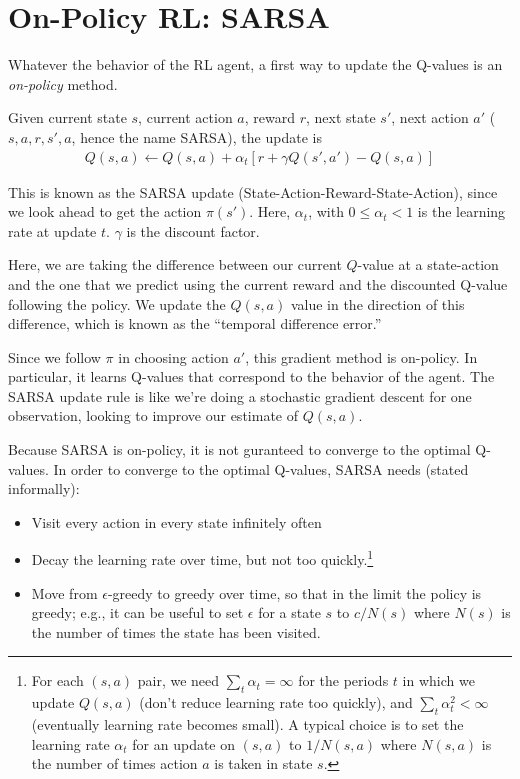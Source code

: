 \documentclass[12pt]{article}
\begin{document}
\section{On-Policy RL: SARSA}

Whatever the behavior of the RL agent, a first way to update the 
Q-values is
an \emph{on-policy} method.

Given current state $s$, current
action $a$, reward $r$, next state $s'$, next action $a'$
($s,a,r,s',a$, hence the name SARSA), the update is
%
%
\begin{align}
    Q(s,a) \leftarrow Q(s,a) + \alpha_t\left[ r + \gamma Q(s', a') - Q(s,a)\right]
\end{align}

This is known as the SARSA update (State-Action-Reward-State-Action),
since we look ahead to get the action $\pi(s')$.  Here, $\alpha_t$,
with $0\leq \alpha_t<1$ is the learning rate at update $t$.
$\gamma$ is the discount factor.

Here, we are taking the difference between our current $Q$-value at a
state-action and the one that we predict using the current reward and the
discounted Q-value following the policy. We update the $Q(s,a)$ value
in the direction of this difference, which is known as the ``temporal
difference error.''

Since we follow $\pi$ in choosing action $a'$, this gradient method is
on-policy. In particular, it learns Q-values that correspond to the
behavior of the agent. The SARSA update rule is like we're doing a
stochastic gradient descent for one observation, looking to improve
our estimate of $Q(s,a)$.

Because SARSA is on-policy, it is not guranteed to converge to the
optimal Q-values. In order to converge to the optimal Q-values, SARSA
needs (stated informally):
%
\begin{itemize}
\item Visit every action in every state infinitely often
\item Decay the learning rate over time, but not too
             quickly.\footnote{For each $(s,a)$ pair, we need
             $\sum_t \alpha_t=\infty$ for the periods $t$ in which we
             update $Q(s,a)$ (don't reduce learning rate too quickly),
             and $\sum_t\alpha_t^2<\infty$ (eventually learning rate
             becomes small). A typical choice is to set the  learning rate
    $\alpha_t$ for an update on $(s,a)$  to $1/N(s,a)$ where
    $N(s,a)$ is the number of times action $a$ is taken in state $s$.}
    \item Move from $\epsilon$-greedy to greedy over time, so that in
      the limit the policy is greedy; e.g., it can be useful to set
      $\epsilon$ for a state $s$ to $c/N(s)$ where $N(s)$ is the
      number of times the state has been visited.
      \end{itemize}
\end{document}
